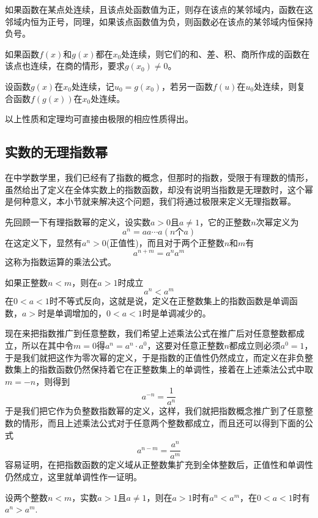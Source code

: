 \begin{inference}
  如果函数在某点处连续，且该点处函数值为正，则存在该点的某邻域内，函数在这邻域内恒为正号，同理，如果该点函数值为负，则函数必在该点的某邻域内恒保持负号。
\end{inference}

\begin{theorem}
  如果函数$f(x)$和$g(x)$都在$x_0$处连续，则它们的和、差、积、商所作成的函数在该点也连续，在商的情形，要求$g(x_0) \neq 0$。
\end{theorem}

\begin{theorem}[复合函数的连续性]
  \label{theorem:the-continuity-of-combine-function}
  设函数$g(x)$在$x_0$处连续，记$u_0=g(x_0)$，若另一函数$f(u)$在$u_0$处连续，则复合函数$f(g(x))$在$x_0$处连续。
\end{theorem}

以上性质和定理均可直接由极限的相应性质得出。

\subsection{实数的无理指数幂}
\label{sec:the-power-of-real-with-rational-exponent}

在中学数学里，我们已经有了指数的概念，但那时的指数，受限于有理数的情形，虽然给出了定义在全体实数上的指数函数，却没有说明当指数是无理数时，这个幂是何种意义，本小节就来解决这个问题，我们将通过极限来定义无理指数幂。

先回顾一下有理指数幂的定义，设实数$a>0$且$a \neq 1$，它的正整数$n$次幂定义为
\[ a^n = aa\cdots a(n\text{个}a) \]
在这定义下，显然有$a^n>0$(正值性)，而且对于两个正整数$n$和$m$有
\begin{equation}
  \label{eq:exponent-multiple-rule-with-positive-integer}
  a^{n+m}=a^na^m
\end{equation}
这称为指数运算的乘法公式。

如果正整数$n<m$，则在$a>1$时成立
\[ a^n<a^m \]
在$0<a<1$时不等式反向，这就是说，定义在正整数集上的指数函数是单调函数，$a>$时是单调增加的，$0<a<1$时是单调减少的。

现在来把指数推广到任意整数，我们希望上述乘法公式在推广后对任意整数都成立，所以在其中令$m=0$得$a^n=a^n \cdot a^0$，这要对任意正整数$n$都成立则必须$a^0=1$，于是我们就把这作为零次幂的定义，于是指数的正值性仍然成立，而定义在非负整数集上的指数函数仍然保持着它在正整数集上的单调性，接着在上述乘法公式中取$m=-n$，则得到
\[ a^{-n} = \frac{1}{a^n} \]
于是我们把它作为负整数指数幂的定义，这样，我们就把指数概念推广到了任意整数的情形，而且上述乘法公式对于任意两个整数都成立，而且还可以得到下面的公式
\[ a^{n-m} = \frac{a^n}{a^m} \]
容易证明，在把指数函数的定义域从正整数集扩充到全体整数后，正值性和单调性仍然成立，这里就单调性作一证明。
\begin{theorem}
  设两个整数$n<m$，实数$a>1$且$a \neq 1$，则在$a>1$时有$a^n<a^m$，在$0<a<1$时有$a^n>a^m$.
\end{theorem}

